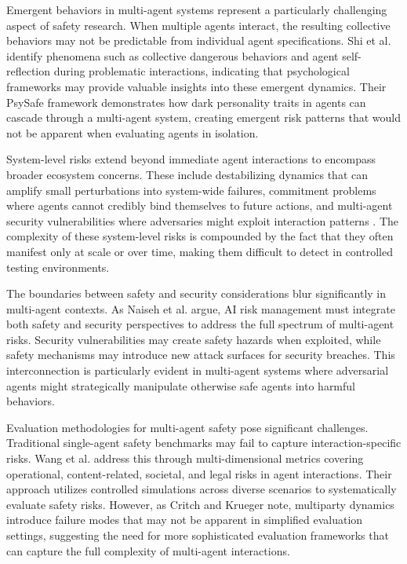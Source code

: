 \documentclass[conference]{IEEEtran}
\begin{document}
Emergent behaviors in multi-agent systems represent a particularly challenging aspect of safety research. When multiple agents interact, the resulting collective behaviors may not be predictable from individual agent specifications. Shi et al. \cite{2401.11880} identify phenomena such as collective dangerous behaviors and agent self-reflection during problematic interactions, indicating that psychological frameworks may provide valuable insights into these emergent dynamics. Their PsySafe framework demonstrates how dark personality traits in agents can cascade through a multi-agent system, creating emergent risk patterns that would not be apparent when evaluating agents in isolation.

System-level risks extend beyond immediate agent interactions to encompass broader ecosystem concerns. These include destabilizing dynamics that can amplify small perturbations into system-wide failures, commitment problems where agents cannot credibly bind themselves to future actions, and multi-agent security vulnerabilities where adversaries might exploit interaction patterns \cite{2502.14143}. The complexity of these system-level risks is compounded by the fact that they often manifest only at scale or over time, making them difficult to detect in controlled testing environments.

The boundaries between safety and security considerations blur significantly in multi-agent contexts. As Naiseh et al. \cite{2405.19524} argue, AI risk management must integrate both safety and security perspectives to address the full spectrum of multi-agent risks. Security vulnerabilities may create safety hazards when exploited, while safety mechanisms may introduce new attack surfaces for security breaches. This interconnection is particularly evident in multi-agent systems where adversarial agents might strategically manipulate otherwise safe agents into harmful behaviors.

Evaluation methodologies for multi-agent safety pose significant challenges. Traditional single-agent safety benchmarks may fail to capture interaction-specific risks. Wang et al. \cite{2409.16427} address this through multi-dimensional metrics covering operational, content-related, societal, and legal risks in agent interactions. Their approach utilizes controlled simulations across diverse scenarios to systematically evaluate safety risks. However, as Critch and Krueger \cite{1810.10862} note, multiparty dynamics introduce failure modes that may not be apparent in simplified evaluation settings, suggesting the need for more sophisticated evaluation frameworks that can capture the full complexity of multi-agent interactions.
\end{document}
